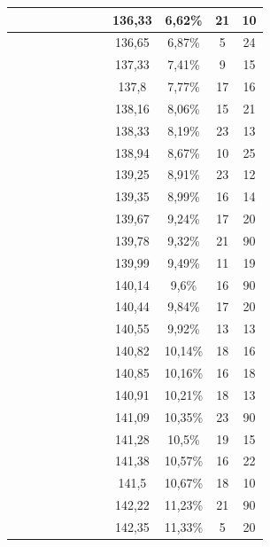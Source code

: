 \begin{center}
\begin{longtable}{|c|c|c|c|c|c|c|c|c|c|c|c|}
 \x &  \x &  \x &  &  &  \x &  &  & 136,33 & 6,62\% & 21 & 10  \\ \hline
 \x &  \x &  &  &  &  \x &  \x &  \x & 136,65 & 6,87\% & 5 & 24  \\ \hline
 \x &  &  &  &  &  \x &  &  & 137,33 & 7,41\% & 9 & 15  \\ \hline
 \x &  &  &  \x &  \x &  \x &  &  \x & 137,8 & 7,77\% & 17 & 16  \\ \hline
 \x &  \x &  &  &  \x &  \x &  &  & 138,16 & 8,06\% & 15 & 21  \\ \hline
 \x &  &  \x &  &  &  &  &  & 138,33 & 8,19\% & 23 & 13  \\ \hline
 \x &  \x &  &  \x &  &  \x &  &  & 138,94 & 8,67\% & 10 & 25  \\ \hline
 \x &  \x &  &  &  &  &  &  \x & 139,25 & 8,91\% & 23 & 12  \\ \hline
 \x &  \x &  &  &  &  \x &  &  & 139,35 & 8,99\% & 16 & 14  \\ \hline
 \x &  \x &  \x &  &  &  &  &  & 139,67 & 9,24\% & 17 & 20  \\ \hline
 \x &  &  \x &  &  \x &  \x &  &  \x & 139,78 & 9,32\% & 21 & 90  \\ \hline
 \x &  \x &  \x &  \x &  &  &  &  & 139,99 & 9,49\% & 11 & 19  \\ \hline
 \x &  &  &  &  &  &  &  \x & 140,14 & 9,6\% & 16 & 90  \\ \hline
 \x &  &  &  &  \x &  &  &  \x & 140,44 & 9,84\% & 17 & 20  \\ \hline
 \x &  &  &  \x &  &  \x &  &  & 140,55 & 9,92\% & 13 & 13  \\ \hline
 \x &  &  \x &  &  &  \x &  &  & 140,82 & 10,14\% & 18 & 16  \\ \hline
 \x &  \x &  \x &  &  &  &  &  \x & 140,85 & 10,16\% & 16 & 18  \\ \hline
 \x &  \x &  \x &  \x &  &  \x &  &  \x & 140,91 & 10,21\% & 18 & 13  \\ \hline
 \x &  \x &  &  &  &  &  &  & 141,09 & 10,35\% & 23 & 90  \\ \hline
 \x &  &  \x &  &  &  &  &  \x & 141,28 & 10,5\% & 19 & 15  \\ \hline
 \x &  &  \x &  &  \x &  &  &  \x & 141,38 & 10,57\% & 16 & 22  \\ \hline
 \x &  &  &  &  \x &  &  &  & 141,5 & 10,67\% & 18 & 10  \\ \hline
 \x &  &  &  &  \x &  \x &  &  & 142,22 & 11,23\% & 21 & 90  \\ \hline
 \x &  \x &  \x &  \x &  &  \x &  \x &  \x & 142,35 & 11,33\% & 5 & 20  \\ \hline

\end{longtable}
\end{center}

